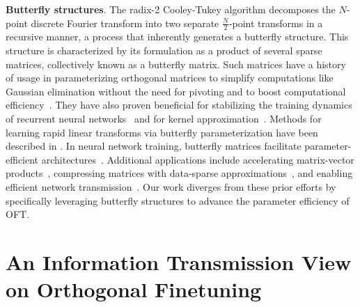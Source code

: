 \textbf{Butterfly structures}. The radix-2 Cooley-Tukey algorithm decomposes the $N$-point discrete Fourier transform into two separate $\frac{N}{2}$-point transforms in a recursive manner, a process that inherently generates a butterfly structure. This structure is characterized by its formulation as a product of several sparse matrices, collectively known as a butterfly matrix. Such matrices have a history of usage in parameterizing orthogonal matrices to simplify computations like Gaussian elimination without the need for pivoting and to boost computational efficiency~\cite{parker1995random}. They have also proven beneficial for stabilizing the training dynamics of recurrent neural networks~\cite{jing2017tunable} and for kernel approximation~\cite{munkhoeva2018quadrature}. Methods for learning rapid linear transforms via butterfly parameterization have been described in \cite{dao2019learning,dao2019kaleidoscope}. In neural network training, butterfly matrices facilitate parameter-efficient architectures~\cite{chen2022pixelated,dao2022monarch}. Additional applications include accelerating matrix-vector products~\cite{michielssen1996multilevel,o2010algorithm}, compressing matrices with data-sparse approximations~\cite{li2015butterfly}, and enabling efficient network transmission~\cite{klasing1994broadcasting,li2003linear,rajasingh2016transmission}. Our work diverges from these prior efforts by specifically leveraging butterfly structures to advance the parameter efficiency of OFT.

\section{An Information Transmission View on Orthogonal Finetuning}

